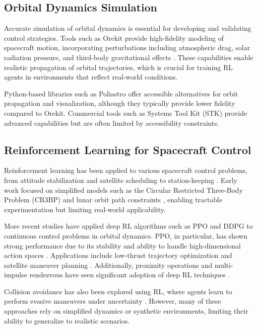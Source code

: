 \documentclass[paper]{ieice}
\begin{document}
\subsection{Orbital Dynamics Simulation}
Accurate simulation of orbital dynamics is essential for developing and validating control strategies. Tools such as Orekit provide high-fidelity modeling of spacecraft motion, incorporating perturbations including atmospheric drag, solar radiation pressure, and third-body gravitational effects \cite{orekit}. These capabilities enable realistic propagation of orbital trajectories, which is crucial for training RL agents in environments that reflect real-world conditions.

Python-based libraries such as Poliastro offer accessible alternatives for orbit propagation and visualization, although they typically provide lower fidelity compared to Orekit. Commercial tools such as Systems Tool Kit (STK) provide advanced capabilities but are often limited by accessibility constraints.

\subsection{Reinforcement Learning for Spacecraft Control}
Reinforcement learning has been applied to various spacecraft control problems, from attitude stabilization \cite{retagne2024adaptive} and satellite scheduling \cite{herrmann2023comparative} to station-keeping \cite{bonasera2023stationkeeping}. Early work focused on simplified models such as the Circular Restricted Three-Body Problem (CR3BP) and lunar orbit path constraints \cite{scorsoglio2023relative}, enabling tractable experimentation but limiting real-world applicability.

More recent studies have applied deep RL algorithms such as PPO and DDPG to continuous control problems in orbital dynamics. PPO, in particular, has shown strong performance due to its stability and ability to handle high-dimensional action spaces \cite{schulman2017ppo}. Applications include low-thrust trajectory optimization and satellite maneuver planning \cite{Zavoli2020RL_low_thrust,zaidi2023cascaded}. Additionally, proximity operations and multi-impulse rendezvous have seen significant adoption of deep RL techniques \cite{hovell2021deep,federici2021deep,xu2023optimal}.

Collision avoidance has also been explored using RL, where agents learn to perform evasive maneuvers under uncertainty \cite{kazemi2024,qu2022spacecraft}. However, many of these approaches rely on simplified dynamics or synthetic environments, limiting their ability to generalize to realistic scenarios.
\end{document}
